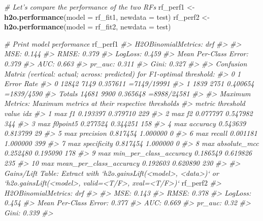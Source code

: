\documentclass[]{book}
\newenvironment{Shaded}{\begin{snugshade}}{\end{snugshade}}
\newcommand{\CommentTok}[1]{\textcolor[rgb]{0.56,0.35,0.01}{\textit{#1}}}
\newcommand{\DataTypeTok}[1]{\textcolor[rgb]{0.13,0.29,0.53}{#1}}
\newcommand{\KeywordTok}[1]{\textcolor[rgb]{0.13,0.29,0.53}{\textbf{#1}}}
\newcommand{\NormalTok}[1]{#1}
\newcommand{\StringTok}[1]{\textcolor[rgb]{0.31,0.60,0.02}{#1}}
\begin{document}
\begin{Shaded}
\begin{Highlighting}[]
\CommentTok{# Let's compare the performance of the two RFs}
\NormalTok{rf_perf1 <-}\StringTok{ }\KeywordTok{h2o.performance}\NormalTok{(}\DataTypeTok{model =}\NormalTok{ rf_fit1,}
                            \DataTypeTok{newdata =}\NormalTok{ test)}
\NormalTok{rf_perf2 <-}\StringTok{ }\KeywordTok{h2o.performance}\NormalTok{(}\DataTypeTok{model =}\NormalTok{ rf_fit2,}
                            \DataTypeTok{newdata =}\NormalTok{ test)}

\CommentTok{# Print model performance}
\NormalTok{rf_perf1}
\CommentTok{#> H2OBinomialMetrics: drf}
\CommentTok{#> }
\CommentTok{#> MSE:  0.144}
\CommentTok{#> RMSE:  0.379}
\CommentTok{#> LogLoss:  0.459}
\CommentTok{#> Mean Per-Class Error:  0.379}
\CommentTok{#> AUC:  0.663}
\CommentTok{#> pr_auc:  0.311}
\CommentTok{#> Gini:  0.327}
\CommentTok{#> }
\CommentTok{#> Confusion Matrix (vertical: actual; across: predicted) for F1-optimal threshold:}
\CommentTok{#>            0    1    Error         Rate}
\CommentTok{#> 0      12842 7149 0.357611  =7149/19991}
\CommentTok{#> 1       1839 2751 0.400654   =1839/4590}
\CommentTok{#> Totals 14681 9900 0.365648  =8988/24581}
\CommentTok{#> }
\CommentTok{#> Maximum Metrics: Maximum metrics at their respective thresholds}
\CommentTok{#>                         metric threshold    value idx}
\CommentTok{#> 1                       max f1  0.193397 0.379710 229}
\CommentTok{#> 2                       max f2  0.077797 0.547982 344}
\CommentTok{#> 3                 max f0point5  0.277524 0.344251 158}
\CommentTok{#> 4                 max accuracy  0.543639 0.813799  29}
\CommentTok{#> 5                max precision  0.817454 1.000000   0}
\CommentTok{#> 6                   max recall  0.001181 1.000000 399}
\CommentTok{#> 7              max specificity  0.817454 1.000000   0}
\CommentTok{#> 8             max absolute_mcc  0.252480 0.195090 178}
\CommentTok{#> 9   max min_per_class_accuracy  0.186549 0.619826 235}
\CommentTok{#> 10 max mean_per_class_accuracy  0.192603 0.620890 230}
\CommentTok{#> }
\CommentTok{#> Gains/Lift Table: Extract with `h2o.gainsLift(<model>, <data>)` or `h2o.gainsLift(<model>, valid=<T/F>, xval=<T/F>)`}
\NormalTok{rf_perf2}
\CommentTok{#> H2OBinomialMetrics: drf}
\CommentTok{#> }
\CommentTok{#> MSE:  0.143}
\CommentTok{#> RMSE:  0.378}
\CommentTok{#> LogLoss:  0.454}
\CommentTok{#> Mean Per-Class Error:  0.377}
\CommentTok{#> AUC:  0.669}
\CommentTok{#> pr_auc:  0.32}
\CommentTok{#> Gini:  0.339}
\CommentTok{#> }

\end{Highlighting}
\end{Shaded}
\end{document}
